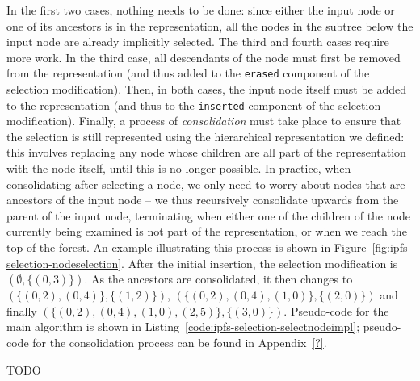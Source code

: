 \noindent In the first two cases, nothing needs to be done: since either the input node or one of its ancestors is in the representation, all the nodes in the subtree below the input node are already implicitly selected. The third and fourth cases require more work. In the third case, all descendants of the node must first be removed from the representation (and thus added to the \texttt{erased} component of the selection modification). Then, in both cases, the input node itself must be added to the representation (and thus to the \texttt{inserted} component of the selection modification). Finally, a process of \emph{consolidation} must take place to ensure that the selection is still represented using the hierarchical representation we defined: this involves replacing any node whose children are all part of the representation with the node itself, until this is no longer possible. In practice, when consolidating after selecting a node, we only need to worry about nodes that are ancestors of the input node -- we thus recursively consolidate upwards from the parent of the input node, terminating when either one of the children of the node currently being examined is not part of the representation, or when we reach the top of the forest. An example illustrating this process is shown in Figure~\ref{fig:ipfs-selection-nodeselection}. After the initial insertion, the selection modification is $(\emptyset,\{(0,3)\})$. As the ancestors are consolidated, it then changes to $(\{(0,2), (0,4)\}, \{(1,2)\})$, $(\{(0,2), (0,4), (1,0)\}, \{(2,0)\})$ and finally $(\{(0,2), (0,4), (1,0), (2,5)\}, \{(3,0)\})$. Pseudo-code for the main algorithm is shown in Listing~\ref{code:ipfs-selection-selectnodeimpl}; pseudo-code for the consolidation process can be found in Appendix~\ref{?}.

TODO

